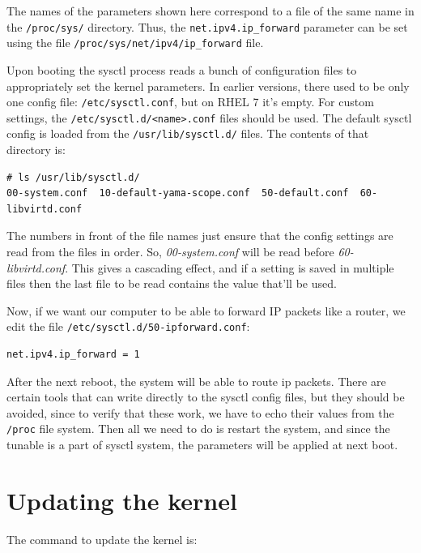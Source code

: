 \noindent
The names of the parameters shown here correspond to a file of the same name in the \verb|/proc/sys/| directory. Thus, the \verb|net.ipv4.ip_forward| parameter can be set using the file \verb|/proc/sys/net/ipv4/ip_forward| file. 

Upon booting the sysctl process reads a bunch of configuration files to appropriately set the kernel parameters. In earlier versions, there used to be only one config file: \verb|/etc/sysctl.conf|, but on RHEL 7 it's empty. For custom settings, the \verb|/etc/sysctl.d/<name>.conf| files should be used. The default sysctl config is loaded from the \verb|/usr/lib/sysctl.d/| files. The contents of that directory is:

\vspace{-15pt}
\begin{verbatim}
# ls /usr/lib/sysctl.d/
00-system.conf  10-default-yama-scope.conf  50-default.conf  60-libvirtd.conf
\end{verbatim}
\vspace{-10pt}

\noindent
The numbers in front of the file names just ensure that the config settings are read from the files in order. So, \textit{00-system.conf} will be read before \textit{60-libvirtd.conf}. This gives a cascading effect, and if a setting is saved in multiple files then the last file to be read contains the value that'll be used. 

Now, if we want our computer to be able to forward IP packets like a router, we edit the file \verb|/etc/sysctl.d/50-ipforward.conf|:

\vspace{-15pt}
\begin{verbatim}
net.ipv4.ip_forward = 1
\end{verbatim}
\vspace{-10pt}

\noindent
After the next reboot, the system will be able to route ip packets. There are certain tools that can write directly to the sysctl config files, but they should be avoided, since to verify that these work, we have to echo their values from the \verb|/proc| file system. Then all we need to do is restart the system, and since the tunable is a part of sysctl system, the parameters will be applied at next boot.

	\section{Updating the kernel}
The command to update the kernel is:

